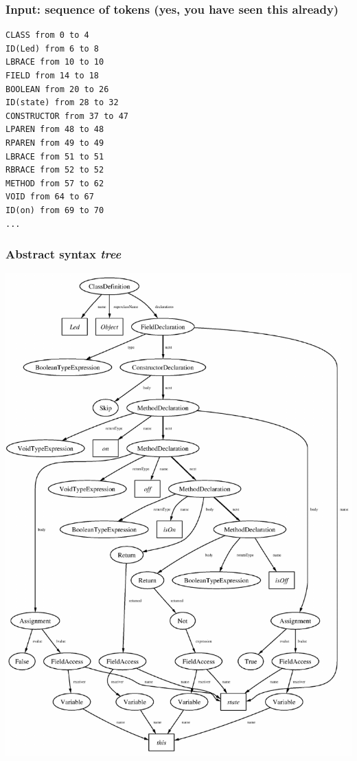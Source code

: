 \documentclass[11pt]{beamer}  %
\begin{document}
\begin{frame}[fragile]
\frametitle{Input: sequence of tokens (yes, you have seen this already)}

\begin{verbatim}
CLASS from 0 to 4
ID(Led) from 6 to 8
LBRACE from 10 to 10
FIELD from 14 to 18
BOOLEAN from 20 to 26
ID(state) from 28 to 32
CONSTRUCTOR from 37 to 47
LPAREN from 48 to 48
RPAREN from 49 to 49
LBRACE from 51 to 51
RBRACE from 52 to 52
METHOD from 57 to 62
VOID from 64 to 67
ID(on) from 69 to 70
...
\end{verbatim}

\end{frame}

\begin{frame}\frametitle{Abstract syntax \emph{tree}}

\begin{center}
\includegraphics[scale=0.4]{pictures/led_logica.pdf}
\end{center}

\end{frame}
\end{document}
